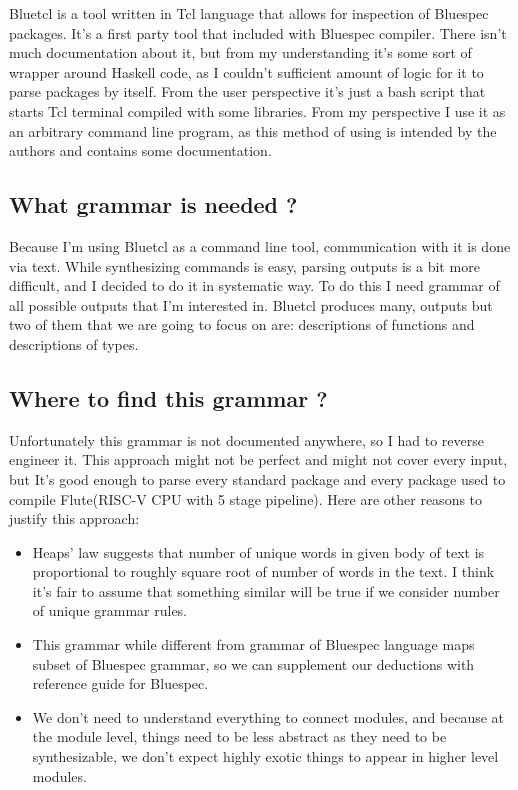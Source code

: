 \documentclass[14pt]{report}
\begin{document}
\begin{tcolorbox}[title=Bluetcl]
    Bluetcl is a tool written in Tcl language that allows for inspection of Bluespec packages. It's a first party tool that included with Bluespec compiler. There isn't much documentation about it, but from my understanding it's some sort of wrapper around Haskell code, as I couldn't sufficient amount of logic for it to parse packages by itself.
    From the user perspective it's just a bash script that starts Tcl terminal compiled with some libraries. From my perspective I use it as an arbitrary command line program, as this method of using is intended by the authors and contains some documentation.
\end{tcolorbox}
\subsection{What grammar is needed ?}
Because I'm using Bluetcl as a command line tool, communication with it is done via text. 
While synthesizing commands is easy, parsing outputs is a bit more difficult, and I decided to do it in systematic way. 
To do this I need grammar of all possible outputs that I'm interested in. 
Bluetcl produces many, outputs but two of them that we are going to focus on are: descriptions of functions and descriptions of types.
\subsection{Where to find this grammar ?}
Unfortunately this grammar is not documented anywhere, so I had to reverse engineer it. This approach might not be perfect and might not cover every input, but It's good enough to parse every standard package and every package used to compile Flute(RISC-V CPU with 5 stage pipeline).
Here are other reasons to justify this approach:
\begin{itemize}
    \item Heaps' law suggests that number of unique words in given body of text is proportional to roughly square root of number of words in the text. I think it's fair to assume that something similar will be true if we consider number of unique grammar rules.
    \item This grammar while different from grammar of Bluespec language maps subset of Bluespec grammar, so we can supplement our deductions with reference guide for Bluespec.
    \item We don't need to understand everything to connect modules, and because at the module level, things need to be less abstract as they need to be synthesizable, we don't expect highly exotic things to appear in higher level modules. 
\end{itemize}
\end{document}
